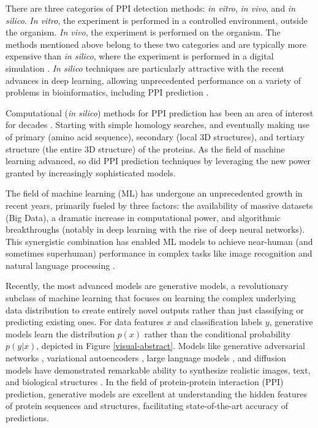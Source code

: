 \documentclass{article}
\begin{document}
There are three categories of PPI detection methods: \textit{in vitro}, \textit{in vivo}, and \textit{in silico}. \textit{In vitro}, the experiment is performed in a controlled environment, outside the organism. \textit{In vivo}, the experiment is performed on the organism. The methods mentioned above belong to these two categories and are typically more expensive than \textit{in silico}, where the experiment is performed in a digital simulation \citep{rao_protein-protein_2014}. \textit{In silico} techniques are particularly attractive with the recent advances in deep learning, allowing unprecedented performance on a variety of problems in bioinformatics, including PPI prediction \citep{zhang_revolutionizing_2024, guo_diffusion_2024}.

Computational (\textit{in silico}) methods for PPI prediction has been an area of interest for decades \citep{dandekar_conservation_1998}. Starting with simple homology searches, and eventually making use of primary (amino acid sequence), secondary (local 3D structures), and tertiary structure (the entire 3D structure) of the proteins. As the field of machine learning advanced, so did PPI prediction techniques by leveraging the new power granted by increasingly sophisticated models.

The field of machine learning (ML) has undergone an unprecedented growth in recent years, primarily fueled by three factors: the availability of massive datasets (Big Data), a dramatic increase in computational power, and algorithmic breakthroughs (notably in deep learning with the rise of deep neural networks). This synergistic combination has enabled ML models to achieve near-human (and sometimes superhuman) performance in complex tasks like image recognition \citep{archana_deep_2024} and natural language processing \citep{qin2025largelanguagemodelsmeet}.

Recently, the most advanced models are generative models, a revolutionary subclass of machine learning that focuses on learning the complex underlying data distribution to create entirely novel outputs rather than just classifying or predicting existing ones. For data features \(x\) and classification labels \(y\), generative models learn the distribution \(p(x)\) rather than the conditional probability \(p(y|x)\), depicted in Figure \ref{visual-abstract}. Models like generative adversarial networks \citep[GANs;][]{goodfellow2014generative}, variational autoencoders \citep[VAE;][]{kingma_vae_2013}, large language models \citep[LLMs;][]{naveed_llm_2025}, and diffusion models \citep{sohl-dickstein_deep_nodate} have demonstrated remarkable ability to synthesize realistic images, text, and biological structures \citep{ramesh2021zeroshottexttoimagegeneration, radford_improving_2018, abramson_accurate_2024}. In the field of protein-protein interaction (PPI) prediction, generative models are excellent at understanding the hidden features of protein sequences and structures, facilitating state-of-the-art accuracy of predictions.
\end{document}
